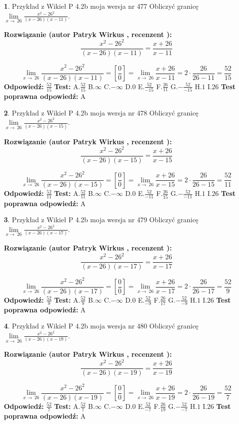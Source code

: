 \documentclass[12pt, a4paper]{article}
\theoremstyle{definition} %
\newtheorem{zad}{}
\newcommand{\zadStart}[1]{\begin{zad}#1\newline}
\newcommand{\zadStop}{\end{zad}}
\newcommand{\rozwStart}[2]{\noindent \textbf{Rozwiązanie (autor #1 , recenzent #2): }\newline}
\newcommand{\rozwStop}{\newline}
\newcommand{\odpStart}{\noindent \textbf{Odpowiedź:}\newline}
\newcommand{\odpStop}{\newline}
\newcommand{\testStart}{\noindent \textbf{Test:}\newline}
\newcommand{\testStop}{\newline}
\newcommand{\kluczStart}{\noindent \textbf{Test poprawna odpowiedź:}\newline}
\newcommand{\kluczStop}{\newline}
\begin{document}
\zadStart{Przykład z Wikieł P 4.2b moja wersja nr 477}
Obliczyć granicę $\lim\limits_{x\to\ 26}\frac{x^{2}-26^{2}}{(x-26)(x-11)}$.
\zadStop
\rozwStart{Patryk Wirkus}{}
$$\frac{x^{2}-26^{2}}{(x-26)(x-11)}=\frac{x+26}{x-11}$$

$$\lim\limits_{x\to\ 26}\frac{x^{2}-26^{2}}{(x-26)(x-11)}=[\frac{0}{0}]=\lim\limits_{x\to\ 26}\frac{x+26}{x-11}=2 \cdot \frac{26}{26-11} = \frac{52}{15}$$
\rozwStop
\odpStart
$\frac{52}{15}$
\odpStop
\testStart
A.$\frac{52}{15}$
B.$\infty$
C.$-\infty$
D.$0$
E.$\frac{52}{-15}$
F.$\frac{26}{11}$
G.$-\frac{52}{-15}$
H.$1$
I.$26$
\testStop
\kluczStart
A
\kluczStop



\zadStart{Przykład z Wikieł P 4.2b moja wersja nr 478}
Obliczyć granicę $\lim\limits_{x\to\ 26}\frac{x^{2}-26^{2}}{(x-26)(x-15)}$.
\zadStop
\rozwStart{Patryk Wirkus}{}
$$\frac{x^{2}-26^{2}}{(x-26)(x-15)}=\frac{x+26}{x-15}$$

$$\lim\limits_{x\to\ 26}\frac{x^{2}-26^{2}}{(x-26)(x-15)}=[\frac{0}{0}]=\lim\limits_{x\to\ 26}\frac{x+26}{x-15}=2 \cdot \frac{26}{26-15} = \frac{52}{11}$$
\rozwStop
\odpStart
$\frac{52}{11}$
\odpStop
\testStart
A.$\frac{52}{11}$
B.$\infty$
C.$-\infty$
D.$0$
E.$\frac{52}{-11}$
F.$\frac{26}{15}$
G.$-\frac{52}{-11}$
H.$1$
I.$26$
\testStop
\kluczStart
A
\kluczStop



\zadStart{Przykład z Wikieł P 4.2b moja wersja nr 479}
Obliczyć granicę $\lim\limits_{x\to\ 26}\frac{x^{2}-26^{2}}{(x-26)(x-17)}$.
\zadStop
\rozwStart{Patryk Wirkus}{}
$$\frac{x^{2}-26^{2}}{(x-26)(x-17)}=\frac{x+26}{x-17}$$

$$\lim\limits_{x\to\ 26}\frac{x^{2}-26^{2}}{(x-26)(x-17)}=[\frac{0}{0}]=\lim\limits_{x\to\ 26}\frac{x+26}{x-17}=2 \cdot \frac{26}{26-17} = \frac{52}{9}$$
\rozwStop
\odpStart
$\frac{52}{9}$
\odpStop
\testStart
A.$\frac{52}{9}$
B.$\infty$
C.$-\infty$
D.$0$
E.$\frac{52}{-9}$
F.$\frac{26}{17}$
G.$-\frac{52}{-9}$
H.$1$
I.$26$
\testStop
\kluczStart
A
\kluczStop



\zadStart{Przykład z Wikieł P 4.2b moja wersja nr 480}
Obliczyć granicę $\lim\limits_{x\to\ 26}\frac{x^{2}-26^{2}}{(x-26)(x-19)}$.
\zadStop
\rozwStart{Patryk Wirkus}{}
$$\frac{x^{2}-26^{2}}{(x-26)(x-19)}=\frac{x+26}{x-19}$$

$$\lim\limits_{x\to\ 26}\frac{x^{2}-26^{2}}{(x-26)(x-19)}=[\frac{0}{0}]=\lim\limits_{x\to\ 26}\frac{x+26}{x-19}=2 \cdot \frac{26}{26-19} = \frac{52}{7}$$
\rozwStop
\odpStart
$\frac{52}{7}$
\odpStop
\testStart
A.$\frac{52}{7}$
B.$\infty$
C.$-\infty$
D.$0$
E.$\frac{52}{-7}$
F.$\frac{26}{19}$
G.$-\frac{52}{-7}$
H.$1$
I.$26$
\testStop
\kluczStart
A
\kluczStop
\end{document}
